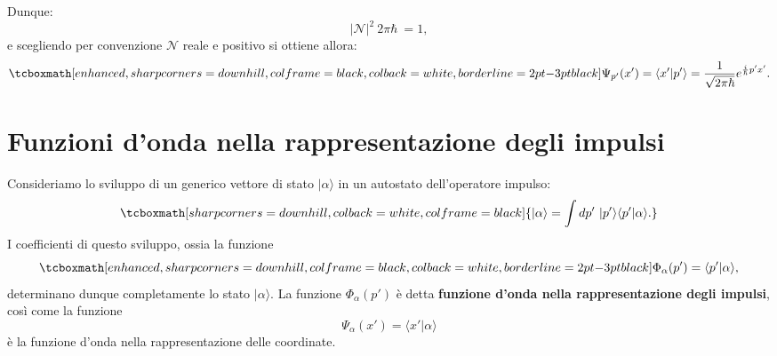Dunque:
	\begin{equation}
		\vert\mathcal{N} \vert ^2\ 2 \pi \hbar\ =1,
	\end{equation}
e scegliendo per convenzione $\mathcal{N}$ reale e positivo si ottiene allora:
	\begin{equation}
		\tcboxmath[enhanced, sharp corners=downhill, colframe=black, colback=white, borderline={2pt}{-3pt}{black}]{
			\Psi_{p'}(x') = \langle x' | p' \rangle = \frac{1}{\sqrt{2 \pi \hbar}} e^{\frac{i}{\hbar}p'x'}.
			}
	\end{equation}

\section[Funzioni d'onda nella rappresentazione degli impulsi]{Funzioni d'onda nella rappresentazione degli impulsi}
Consideriamo lo sviluppo di un generico vettore di stato $| \alpha \rangle$ in un autostato dell'operatore impulso:
	\begin{equation}
		\tcboxmath[sharp corners=downhill, colback=white, colframe=black]{
			| \alpha \rangle = \int dp' ~ | p' \rangle \langle p' | \alpha \rangle.
		}	
	\end{equation}
I coefficienti di questo sviluppo, ossia la funzione
	\begin{equation}
		\tcboxmath[enhanced, sharp corners=downhill, colframe=black, colback=white, borderline={2pt}{-3pt}{black}]{
			\Phi_\alpha (p') =  \langle p' | \alpha \rangle,
			}
	\end{equation}
determinano dunque completamente lo stato $| \alpha \rangle$. La funzione $\Phi_\alpha (p')$ è detta \textbf{funzione d'onda nella rappresentazione degli impulsi}, così come la funzione
	\begin{equation}
		\Psi_\alpha (x') =  \langle x' | \alpha \rangle
	\end{equation}
è la funzione d'onda nella rappresentazione delle coordinate.\\

